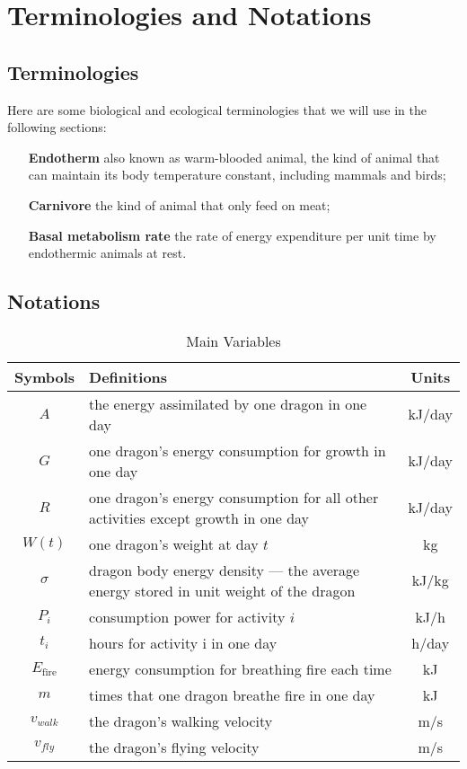 \documentclass{mcmthesis}
\begin{document}
\section{Terminologies and Notations}

\subsection{Terminologies}
Here are some biological and ecological terminologies that we will use in the following sections:
\begin{itemize}
\item[\textbf{Endotherm}] also known as warm-blooded animal, the kind of animal that can maintain its body temperature constant, including mammals and birds;
\item[\textbf{Carnivore}] the kind of animal that only feed on meat;
\item[\textbf{Basal metabolism rate}] the rate of energy expenditure per unit time by endothermic animals at rest.
\end{itemize}
\subsection{Notations}
\begin{table}[h]
\centering
\caption{Main Variables}
\label{Variables}
\begin{tabular}{cp{10cm}c}
\toprule
Symbols & Definitions & Units\\
\midrule
$A$ & the energy assimilated by one dragon in one day & kJ/day\\
$G$ & one dragon's energy consumption for growth in one day & kJ/day\\
$R$ & one dragon's energy consumption for all other activities except growth in one day & kJ/day\\
$W(t)$ & one dragon's weight at day $t$ & kg\\
$\sigma$ & dragon body energy density --- the average energy stored in unit weight of the dragon & kJ/kg\\
$P_i$ & consumption power for activity $i$ & kJ/h\\
$t_i$ & hours for activity i in one day & h/day\\
$E_{\text{fire}}$ & energy consumption for breathing fire each time & kJ\\
$m$ & times that one dragon breathe fire in one day & kJ\\
$v_{walk}$ & the dragon's walking velocity & m/s\\
$v_{fly}$ & the dragon's flying velocity & m/s\\

\bottomrule
\end{tabular}
\end{table}
\end{document}
